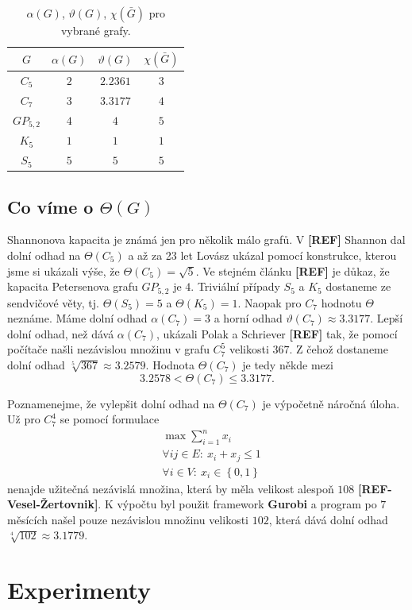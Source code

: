 \begin{table}[h!]
    \centering
    \begin{tabular}{ c | c c c }
        $G$        & $\alpha(G)$ & $\vartheta(G)$ & $\chi(\bar{G})$ \\
        \hline
        $C_5$      & $2$         & $2.2361$       & $3$ \\  
        $C_7$      & $3$         & $3.3177$       & $4$ \\
        $GP_{5,2}$ & $4$         & $4$            & $5$ \\
        $K_5$      & $1$         & $1$            & $1$ \\
        $S_5$      & $5$         & $5$            & $5$
    \end{tabular}
    \caption{$\alpha(G)$, $\vartheta(G)$, $\chi(\bar{G})$ pro vybrané grafy.}
    \label{tab:sandwitch}
\end{table}

\subsection*{Co víme o $\Theta(G)$}

Shannonova kapacita je známá jen pro několik málo grafů. V \textbf{[REF]} Shannon dal dolní odhad na $\Theta(C_5)$ a až za 23 let Lovász ukázal pomocí konstrukce, kterou jsme si ukázali výše, že $\Theta(C_5) = \sqrt{5}$. Ve stejném článku \textbf{[REF]} je důkaz, že kapacita Petersenova grafu $GP_{5,2}$ je $4$. Triviální případy $S_5$ a $K_5$ dostaneme ze sendvičové věty, tj. $\Theta(S_5) = 5$ a $\Theta(K_5) = 1$. Naopak pro $C_7$ hodnotu $\Theta$ neznáme. Máme dolní odhad $\alpha(C_7) = 3$ a horní odhad $\vartheta(C_7) \approx 3.3177$. Lepší dolní odhad, než dává $\alpha(C_7)$, ukázali Polak a Schriever \textbf{[REF]} tak, že pomocí počítače našli nezávislou množinu v grafu $C_7^5$ velikosti $367$. Z čehož dostaneme dolní odhad $\sqrt[5]{367} \approx 3.2579$. Hodnota $\Theta(C_7)$ je tedy někde mezi
$$
    3.2578 < \Theta(C_7) \leq 3.3177.
$$

Poznamenejme, že vylepšit dolní odhad na $\Theta(C_7)$ je výpočetně náročná úloha. Už pro $C_7^4$ se pomocí formulace
\begin{equation*}
    \begin{split}
        &\max \sum_{i=1}^n x_i \\
        &\forall ij \in E:\ x_i + x_j \leq 1 \\
        &\forall i \in V:\ x_i \in \left\{ 0, 1 \right\}
    \end{split}
\end{equation*}
nenajde užitečná nezávislá množina, která by měla velikost alespoň $108$ \textbf{[REF-Vesel-Žertovnik]}. K výpočtu byl použit framework \textbf{Gurobi} a program po $7$ měsících našel pouze nezávislou množinu velikosti $102$, která dává dolní odhad $\sqrt[4]{102} \approx 3.1779$.


\section{Experimenty}
